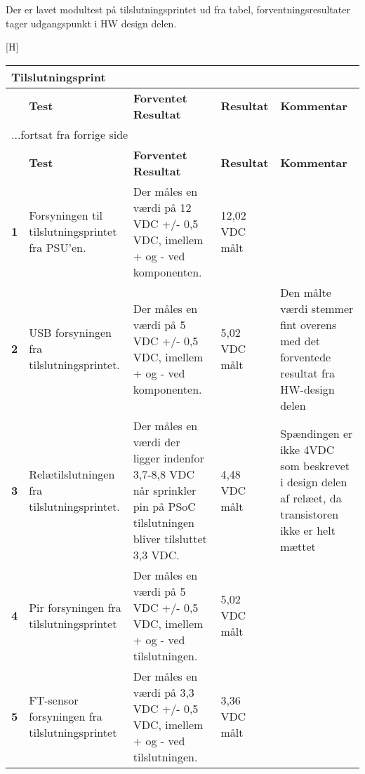Der er lavet modultest på tilslutningsprintet ud fra tabel, forventningsresultater tager udgangspunkt i HW design delen.

\begin{center}[H]
\begin{longtable}{|p{}|p{}|p{}|p{}|p{}|} %
\hline
\multicolumn{5}{|l|}{\textbf{Tilslutningsprint}} \\ \hline
\multicolumn{1}{|c|}{} &
\textbf{Test} &
\textbf{Forventet \newline Resultat} &
\textbf{Resultat} &
\textbf{Kommentar} \\ \hline 
\endfirsthead

\multicolumn{5}{l}{...fortsat fra forrige side} \\ \hline 
\multicolumn{1}{|c|}{} &
\textbf{Test} &
\textbf{Forventet \newline Resultat} &
\textbf{Resultat} &
\textbf{Kommentar} \\ \hline 
\endhead

\textbf{1}	&Forsyningen til tilslutningsprintet fra PSU'en.
			&Der måles en værdi på 12 VDC +/- 0,5 VDC, imellem + og - ved komponenten.
			&12,02 VDC målt
			&  \\ \hline 
			
\textbf{2}	&USB forsyningen fra tilslutningsprintet.
			&Der måles en værdi på 5 VDC +/- 0,5 VDC,  imellem + og - ved komponenten.
			&5,02 VDC målt
			&Den målte værdi stemmer fint overens med det forventede resultat fra HW-design delen \\ \hline 
			
\textbf{3}	&Relætilslutningen fra tilslutningsprintet.
			&Der måles en værdi der ligger indenfor 3,7-8,8 VDC når sprinkler pin på PSoC tilslutningen bliver tilsluttet 3,3 VDC. 
			&4,48 VDC målt
			&Spændingen er ikke 4VDC som beskrevet i design delen af relæet, da transistoren ikke er helt mættet\\ \hline 
			
\textbf{4}	&Pir forsyningen fra tilslutningsprintet
			&Der måles en værdi på 5 VDC +/- 0,5 VDC, imellem + og - ved tilslutningen.
			&5,02 VDC målt
			& \\ \hline 
			
\textbf{5}	&FT-sensor forsyningen fra tilslutningsprintet
			&Der måles en værdi på 3,3 VDC +/- 0,5 VDC, imellem + og - ved tilslutningen.
			& 3,36 VDC målt
			& \\ \hline 						
			

\end{longtable}
\end{center}
